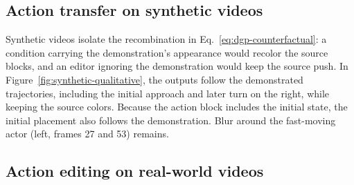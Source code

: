 \subsection{Action transfer on synthetic videos}
\label{subsec:synthetic-experiments}
Synthetic videos isolate the recombination in
Eq.~\ref{eq:dgp-counterfactual}: a condition carrying the demonstration's
appearance would recolor the source blocks, and an editor ignoring the
demonstration would keep the source push. In
Figure~\ref{fig:synthetic-qualitative}, the outputs follow the demonstrated
trajectories, including the initial approach and later turn on the right,
while keeping the source colors. Because the action block includes the
initial state, the initial placement also follows the demonstration. Blur
around the fast-moving actor (left, frames 27 and 53) remains.

\subsection{Action editing on real-world videos}
\label{subsec:real-experiments}

